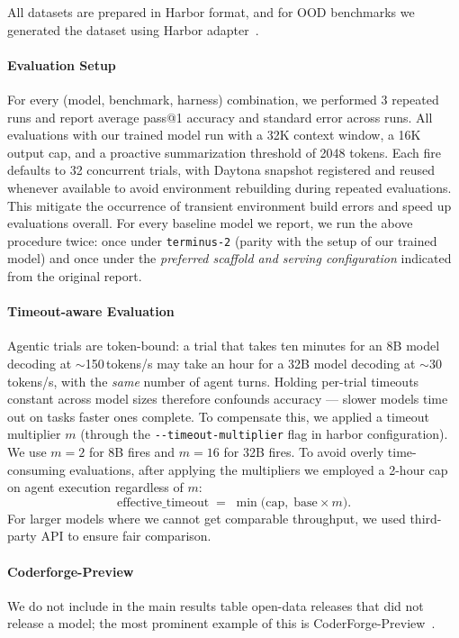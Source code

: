 \documentclass{llmxive}
\begin{document}
All datasets are prepared in Harbor format, and for OOD benchmarks we generated the dataset using Harbor adapter~\citep{Harbor_Framework}.

\paragraph{Evaluation Setup} 
\label{app:eval-setup}
For every (model, benchmark, harness) combination, we performed 3 repeated runs and report average pass@1 accuracy and standard error across runs. All evaluations with our trained model run with a 32K context window, a 16K output cap, and a proactive summarization threshold of 2048 tokens. Each fire defaults to 32 concurrent trials, with Daytona snapshot registered and reused whenever available to avoid environment rebuilding during repeated evaluations. This mitigate the occurrence of transient environment build errors and speed up evaluations overall. For every baseline model we report, we run the above procedure twice: once under \texttt{terminus-2} (parity with the setup of our trained model) and once under the \emph{preferred scaffold and serving configuration} indicated from the original report. 

\paragraph{Timeout-aware Evaluation}
\label{app:eval-time}
Agentic trials are token-bound: a trial that takes
ten minutes for an 8B model decoding at $\sim$150\,tokens/s may take
an hour for a 32B model decoding at $\sim$30\,tokens/s, with the
\emph{same} number of agent turns. Holding per-trial timeouts
constant across model sizes therefore confounds accuracy --- slower
models time out on tasks faster ones complete. To compensate this, we applied a timeout multiplier $m$ (through the \texttt{-{}-timeout-multiplier} flag in harbor configuration).
We use $m = 2$ for 8B fires and $m = 16$ for 32B fires. To avoid overly time-consuming evaluations, after applying the multipliers we employed a 2-hour cap on agent execution regardless of $m$:
\[
  \text{effective\_timeout}
  \;=\; \min\!\big(\text{cap},\; \text{base} \times m\big).
\]
For larger models where we cannot get comparable throughput, we used third-party API to ensure fair comparison. 

\paragraph{Coderforge-Preview}We do not include in the main results table open-data releases that did not release a model; the most prominent example of this is CoderForge-Preview~\citep{CoderForge2026}.
\end{document}
